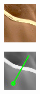 \begin{figure}[htbp]
	\begin{subfigure}[b]{0.15\textwidth}
		\centering
		\includegraphics[width=\linewidth]{figures/skeletoncoast_patch}
		\caption{}
		\label{fig:skeletoncoast_patch}
	\end{subfigure}
	\begin{subfigure}[b]{0.15\textwidth}
		\centering
		\includegraphics[width=\linewidth]{figures/skeletoncoast_patch_arrow}

\end{subfigure}
\end{figure}
